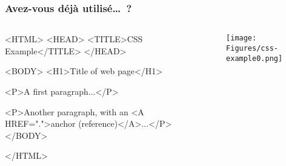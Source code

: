 \begin{frame}[fragile]
\frametitle{Avez-vous d\'ej\`a utilis\'e\ldots\ ?}


\begin{columns}[b]
\begin{column}{5.5cm}
\hspace{-2cm}\begin{block}{}
{\footnotesize
\begin{semiverbatim}
<HTML>
<HEAD>
<TITLE>CSS Example</TITLE>
</HEAD>

<BODY>
<H1>Title of web page</H1>

<P>A first paragraph...</P>

<P>Another paragraph, with an
<A HREF=".">anchor
(reference)</A>...</P>
</BODY>

</HTML>




\end{semiverbatim}
}
\end{block}
\end{column}

\begin{column}{3cm}
\vspace{0.25cm}
{\hspace*{-1cm}\texttt{[image: Figures/css-example0.png]}}
\vspace{2cm}
\end{column}


\end{columns}



\end{frame}



